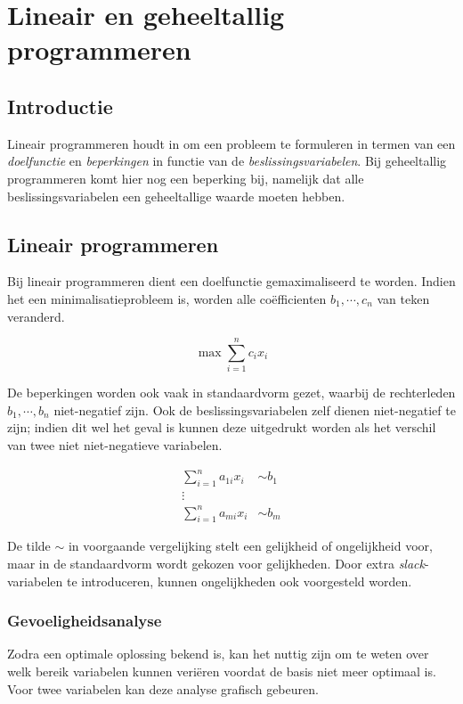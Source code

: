 \chapter{Lineair en geheeltallig programmeren}

\section{Introductie}
Lineair programmeren houdt in om een probleem te formuleren in termen van een \emph{doelfunctie} en \emph{beperkingen} in functie van de \emph{beslissingsvariabelen}. Bij geheeltallig programmeren komt hier nog een beperking bij, namelijk dat alle beslissingsvariabelen een geheeltallige waarde moeten hebben.

\section{Lineair programmeren}
Bij lineair programmeren dient een doelfunctie gemaximaliseerd te worden.
Indien het een minimalisatieprobleem is, worden alle co\"efficienten $b_1, \cdots, c_n$ van teken veranderd.

\begin{equation}
    \max{\sum_{i=1}^{n}{c_{i}x_i}}
\end{equation}

De beperkingen worden ook vaak in standaardvorm gezet, waarbij de rechterleden $b_1, \cdots, b_n$ niet-negatief zijn.
Ook de beslissingsvariabelen zelf dienen niet-negatief te zijn; indien dit wel het geval is kunnen deze uitgedrukt worden als het verschil van twee niet niet-negatieve variabelen.

\begin{align*} 
    \sum_{i=1}^{n}{a_{1i}x_i} & \sim  b_1 \\ 
    \vdots \\
    \sum_{i=1}^{n}{a_{mi}x_i} & \sim  b_m
\end{align*}

De tilde $\sim$ in voorgaande vergelijking stelt een gelijkheid of ongelijkheid voor, maar in de standaardvorm wordt gekozen voor gelijkheden. 
Door extra \emph{slack}-variabelen te introduceren, kunnen ongelijkheden ook voorgesteld worden.

\subsection{Gevoeligheidsanalyse}
Zodra een optimale oplossing bekend is, kan het nuttig zijn om te weten over welk bereik variabelen kunnen veri\"eren voordat de basis niet meer optimaal is. 
Voor twee variabelen kan deze analyse grafisch gebeuren.

